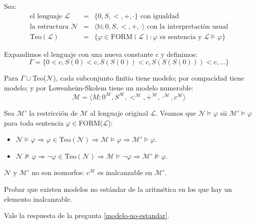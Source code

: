 \begin{questions}
\begin{solution}

 Sea:
 \begin{eqnarray*}
 \text{el lenguaje }\mathcal{L}&=&\{0,S,<,+,\cdotp\} \text{ con igualdad}\\
 \text{la estructura }\mathcal{N}&=&\langle\mathbb{N};0,S,<,+,\cdotp\rangle \text{ con la interpretaci\'on usual}\\
 \text{Teo}(\mathcal{L})&=&\{\varphi\in\text{FORM}(\mathcal{L}) : \varphi\text{ es sentencia y }\mathcal{L}\vDash\varphi\}
 \end{eqnarray*}

 Expandimos el lenguaje con una nueva constante $c$ y definimos: 
 \begin{equation*}
  \Gamma = \{0 < c, S(0)<c, S(S(0))<c, S(S(S(0)))<c, \dots\}
 \end{equation*}

  Para $\Gamma\cup$Teo($\mathcal{N}$), cada subconjunto finitio tiene modelo; por compacidad tiene modelo; y por Lowenheim-Skolem tiene un modelo numerable: 
  \begin{equation*}
   \mathcal{M} = \langle M;0^\mathcal{M}, S^\mathcal{M},<^\mathcal{M},+^\mathcal{M},\cdotp^\mathcal{M},c^\mathcal{M}\rangle
  \end{equation*}
  
  Sea $\mathcal{M}'$ la restricci\'on de $\mathcal{M}$ al lenguaje original $\mathcal{L}$. Veamos que $\mathcal{N}\vDash\varphi$ sii $\mathcal{M}'\vDash\varphi$ para toda sentencia $\varphi\in$FORM($\mathcal{L}$): 
  
  \begin{itemize}
   \item $\mathcal{N}\vDash\varphi \Rightarrow \varphi\in\text{Teo}(\mathcal{N}) \Rightarrow \mathcal{M}\vDash\varphi \Rightarrow \mathcal{M}'\vDash\varphi$.
   \item $\mathcal{N}\nvDash\varphi \Rightarrow \neg\varphi\in\text{Teo}(\mathcal{N}) \Rightarrow \mathcal{M}\vDash\neg\varphi \Rightarrow \mathcal{M}'\nvDash\varphi$.
  \end{itemize}
  
  $\mathcal{N}$ y $\mathcal{M}'$ no son isomorfos: $c^\mathcal{M}$ es inalcanzable en $\mathcal{M}'$.

\end{solution}

\question Probar que existen modelos no est\'andar de la aritm\'etica en los que hay un elemento inalcanzable. 

\begin{solution} 
Vale la respuesta de la pregunta \ref{modelo-no-estandar}.
\end{solution}


\end{questions}
